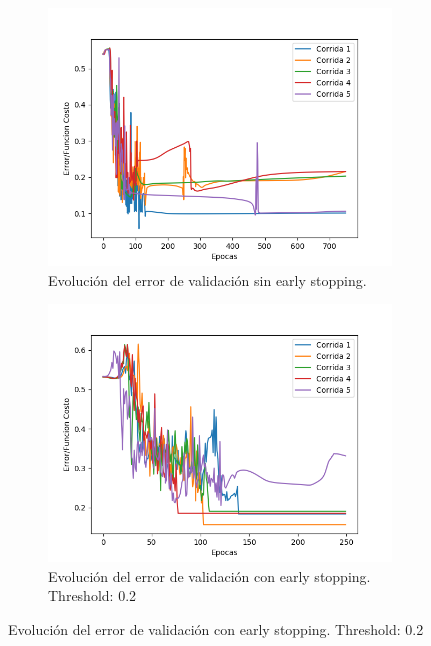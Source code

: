 \begin{figure}[!htbp]
\centering
\begin{subfigure}{.5\textwidth}
  \centering
  \includegraphics[width=1\linewidth]{graficos/early_stopping_validacion_0.png}
  \caption{Evolución del error de validación sin early stopping.}
  \label{fig:sub1}
\end{subfigure}%
\begin{subfigure}{.5\textwidth}
  \centering
  \includegraphics[width=1\linewidth]{graficos/early_stopping_validacion_0_2.png}
  \caption{Evolución del error de validación con early stopping. Threshold: 0.2}
  \label{fig:sub2}
\end{subfigure}
\end{figure}

